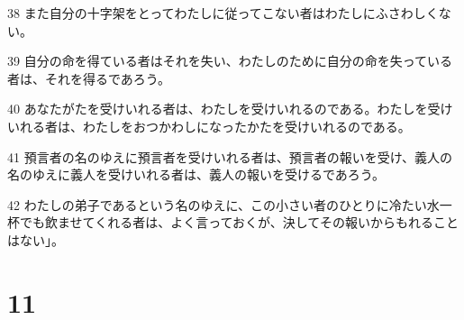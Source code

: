 \par 38 また自分の十字架をとってわたしに従ってこない者はわたしにふさわしくない。
\par 39 自分の命を得ている者はそれを失い、わたしのために自分の命を失っている者は、それを得るであろう。
\par 40 あなたがたを受けいれる者は、わたしを受けいれるのである。わたしを受けいれる者は、わたしをおつかわしになったかたを受けいれるのである。
\par 41 預言者の名のゆえに預言者を受けいれる者は、預言者の報いを受け、義人の名のゆえに義人を受けいれる者は、義人の報いを受けるであろう。
\par 42 わたしの弟子であるという名のゆえに、この小さい者のひとりに冷たい水一杯でも飲ませてくれる者は、よく言っておくが、決してその報いからもれることはない」。

\chapter{11}

